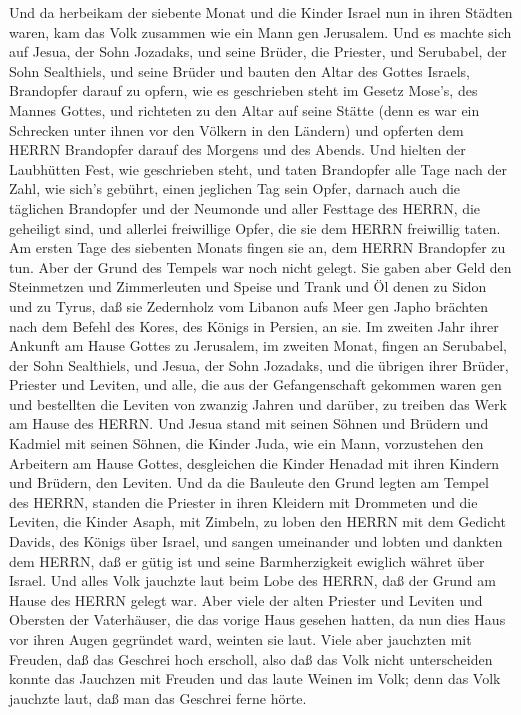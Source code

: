  Und da herbeikam der siebente Monat und die Kinder Israel
nun in ihren Städten waren, kam das Volk zusammen wie ein Mann gen
Jerusalem.  Und es machte sich auf Jesua, der Sohn Jozadaks,
und seine Brüder, die Priester, und Serubabel, der Sohn Sealthiels, und
seine Brüder und bauten den Altar des Gottes Israels, Brandopfer darauf
zu opfern, wie es geschrieben steht im Gesetz Mose's, des Mannes Gottes,
 und richteten zu den Altar auf seine Stätte (denn es war
ein Schrecken unter ihnen vor den Völkern in den Ländern) und opferten
dem HERRN Brandopfer darauf des Morgens und des Abends.  Und
hielten der Laubhütten Fest, wie geschrieben steht, und taten Brandopfer
alle Tage nach der Zahl, wie sich's gebührt, einen jeglichen Tag sein
Opfer,  darnach auch die täglichen Brandopfer und der
Neumonde und aller Festtage des HERRN, die geheiligt sind, und allerlei
freiwillige Opfer, die sie dem HERRN freiwillig taten.  Am
ersten Tage des siebenten Monats fingen sie an, dem HERRN Brandopfer zu
tun. Aber der Grund des Tempels war noch nicht gelegt.  Sie
gaben aber Geld den Steinmetzen und Zimmerleuten und Speise und Trank
und Öl denen zu Sidon und zu Tyrus, daß sie Zedernholz vom Libanon aufs
Meer gen Japho brächten nach dem Befehl des Kores, des Königs in
Persien, an sie.  Im zweiten Jahr ihrer Ankunft am Hause
Gottes zu Jerusalem, im zweiten Monat, fingen an Serubabel, der Sohn
Sealthiels, und Jesua, der Sohn Jozadaks, und die übrigen ihrer Brüder,
Priester und Leviten, und alle, die aus der Gefangenschaft gekommen
waren gen und bestellten die Leviten von zwanzig Jahren und darüber, zu
treiben das Werk am Hause des HERRN.  Und Jesua stand mit
seinen Söhnen und Brüdern und Kadmiel mit seinen Söhnen, die Kinder
Juda, wie ein Mann, vorzustehen den Arbeitern am Hause Gottes,
desgleichen die Kinder Henadad mit ihren Kindern und Brüdern, den
Leviten.  Und da die Bauleute den Grund legten am Tempel
des HERRN, standen die Priester in ihren Kleidern mit Drommeten und die
Leviten, die Kinder Asaph, mit Zimbeln, zu loben den HERRN mit dem
Gedicht Davids, des Königs über Israel,  und sangen
umeinander und lobten und dankten dem HERRN, daß er gütig ist und seine
Barmherzigkeit ewiglich währet über Israel. Und alles Volk jauchzte laut
beim Lobe des HERRN, daß der Grund am Hause des HERRN gelegt war.
 Aber viele der alten Priester und Leviten und Obersten der
Vaterhäuser, die das vorige Haus gesehen hatten, da nun dies Haus vor
ihren Augen gegründet ward, weinten sie laut. Viele aber jauchzten mit
Freuden, daß das Geschrei hoch erscholl,  also daß das Volk
nicht unterscheiden konnte das Jauchzen mit Freuden und das laute Weinen
im Volk; denn das Volk jauchzte laut, daß man das Geschrei ferne hörte.

